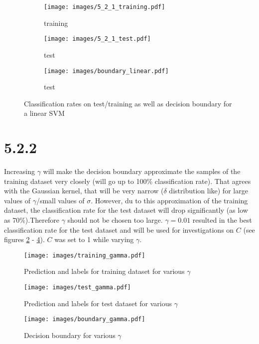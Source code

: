 \documentclass[a4paper,11pt]{article}
\theoremstyle{definition}
\theoremstyle{plain}
\theoremstyle{remark}
\begin{document}
\begin{figure}[H]
\centering
\begin{subfigure}{0.3\textwidth}
\centering
\texttt{[image: images/5\_2\_1\_training.pdf]}
\caption{training}
\end{subfigure}
\hfill
\begin{subfigure}{0.3\textwidth}
\centering
\texttt{[image: images/5\_2\_1\_test.pdf]}
\caption{test}
\end{subfigure}
\hfill
\begin{subfigure}{0.3\textwidth}
\centering
\texttt{[image: images/boundary\_linear.pdf]}
\caption{test}
\end{subfigure}
\caption{Classification rates on test/training as well as decision boundary for a linear SVM}
\label{fig:linear}
\end{figure}

\section*{5.2.2}

Increasing $\gamma$ will make the decision boundary approximate the samples of the training dataset very closely (will go up to 100\% classification rate). That agrees with the Gaussian kernel, that will be very narrow ($\delta$ distribution like) for large values of $\gamma$/small values of $\sigma$. However, du to this approximation of the training dataset, the classification rate for the test dataset will drop significantly (as low as 70\%).Therefore $\gamma$ should not be chosen too large. $\gamma=0.01$ resulted in the best classification rate for the test dataset and will be used for investigations on $C$ (see figures \ref{fig:tr_g} - \ref{fig:bnd_g}). $C$ was set to 1 while varying $\gamma$.

\begin{figure}[H]
\centering
\texttt{[image: images/training\_gamma.pdf]}
\caption{Prediction and labels for training dataset for various $\gamma$}
\label{fig:tr_g}
\end{figure}

\begin{figure}[H]
\centering
\texttt{[image: images/test\_gamma.pdf]}
\caption{Prediction and labels for test dataset for various $\gamma$}
\label{fig:te_g}
\end{figure}

\begin{figure}[H]
\centering
\texttt{[image: images/boundary\_gamma.pdf]}
\caption{Decision boundary for various $\gamma$}
\label{fig:bnd_g}
\end{figure}
\end{document}
